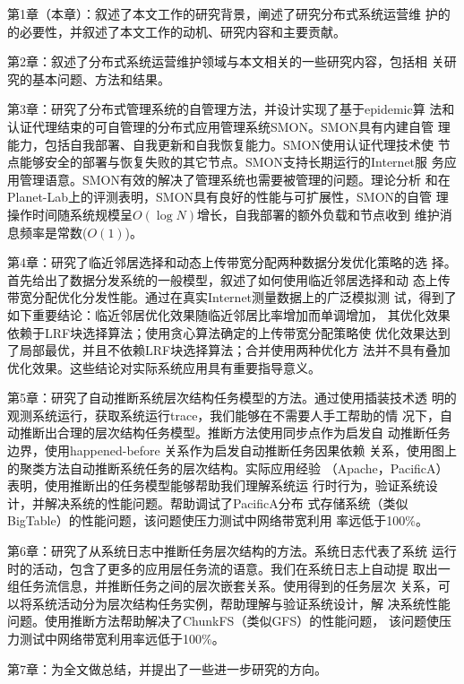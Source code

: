  第1章（本章）：叙述了本文工作的研究背景，阐述了研究分布式系统运营维
  护的的必要性，并叙述了本文工作的动机、研究内容和主要贡献。

  第2章：叙述了分布式系统运营维护领域与本文相关的一些研究内容，包括相
  关研究的基本问题、方法和结果。

  第3章：研究了分布式管理系统的自管理方法，并设计实现了基于epidemic算
  法和认证代理结束的可自管理的分布式应用管理系统SMON。SMON具有内建自管
  理能力，包括自我部署、自我更新和自我恢复能力。SMON使用认证代理技术使
  节点能够安全的部署与恢复失败的其它节点。SMON支持长期运行的Internet服
  务应用管理语意。SMON有效的解决了管理系统也需要被管理的问题。理论分析
  和在Planet-Lab上的评测表明，SMON具有良好的性能与可扩展性，SMON的自管
  理操作时间随系统规模呈$O(\log N)$增长，自我部署的额外负载和节点收到
  维护消息频率是常数($O(1)$)。

  第4章：研究了临近邻居选择和动态上传带宽分配两种数据分发优化策略的选
  择。首先给出了数据分发系统的一般模型，叙述了如何使用临近邻居选择和动
  态上传带宽分配优化分发性能。通过在真实Internet测量数据上的广泛模拟测
  试，得到了如下重要结论：临近邻居优化效果随临近邻居比率增加而单调增加，
  其优化效果依赖于LRF块选择算法；使用贪心算法确定的上传带宽分配策略使
  优化效果达到了局部最优，并且不依赖LRF块选择算法；合并使用两种优化方
  法并不具有叠加优化效果。这些结论对实际系统应用具有重要指导意义。

  第5章：研究了自动推断系统层次结构任务模型的方法。通过使用插装技术透
  明的观测系统运行，获取系统运行trace，我们能够在不需要人手工帮助的情
  况下，自动推断出合理的层次结构任务模型。推断方法使用同步点作为启发自
  动推断任务边界，使用happened-before 关系作为启发自动推断任务因果依赖
  关系，使用图上的聚类方法自动推断系统任务的层次结构。实际应用经验
  （Apache，PacificA）表明，使用推断出的任务模型能够帮助我们理解系统运
  行时行为，验证系统设计，并解决系统的性能问题。帮助调试了PacificA分布
  式存储系统（类似BigTable）的性能问题，该问题使压力测试中网络带宽利用
  率远低于100\%。

  第6章：研究了从系统日志中推断任务层次结构的方法。系统日志代表了系统
  运行时的活动，包含了更多的应用层任务流的语意。我们在系统日志上自动提
  取出一组任务流信息，并推断任务之间的层次嵌套关系。使用得到的任务层次
  关系，可以将系统活动分为层次结构任务实例，帮助理解与验证系统设计，解
  决系统性能问题。使用推断方法帮助解决了ChunkFS（类似GFS）的性能问题，
  该问题使压力测试中网络带宽利用率远低于100\%。

  第7章：为全文做总结，并提出了一些进一步研究的方向。
